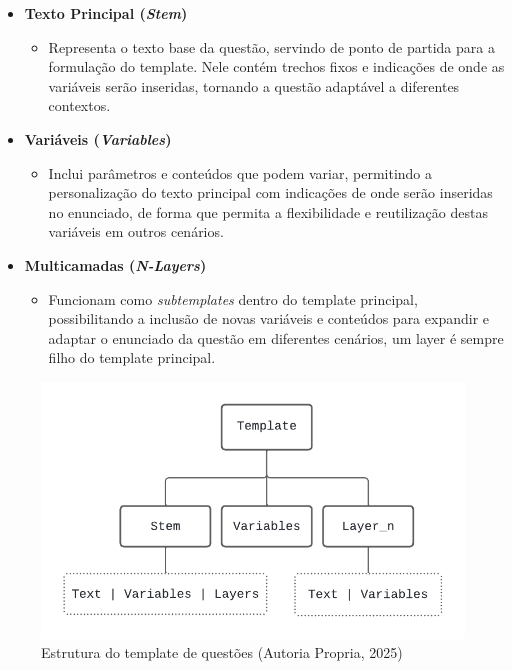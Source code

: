 \begin{itemize} \item \textbf{Texto Principal (\textit{Stem})} \begin{itemize} \item Representa o texto base da questão, servindo de ponto de partida para a formulação do template. Nele contém trechos fixos e indicações de onde as variáveis serão inseridas, tornando a questão adaptável a diferentes contextos. \end{itemize}
\item \textbf{Variáveis (\textit{Variables})}
\begin{itemize}
    \item Inclui parâmetros e conteúdos que podem variar, permitindo a personalização do texto principal com indicações de onde serão inseridas no enunciado, de forma que permita a flexibilidade e reutilização destas variáveis em outros cenários.
\end{itemize}

\item \textbf{Multicamadas (\textit{N-Layers})}
\begin{itemize}
    \item Funcionam como \textit{subtemplates} dentro do template principal, possibilitando a inclusão de novas variáveis e conteúdos para expandir e adaptar o enunciado da questão em diferentes cenários, um layer é sempre filho do template principal.
    \end{itemize}
\end{itemize}


\begin{figure}[ht]
	\centering
	\includegraphics[width=14cm]{./imagens/capitulo5/template-json-example-1}
	\caption{Estrutura do template de questões (Autoria Propria, 2025) }
	\label{fig:template-json-example-1}
\end{figure}



